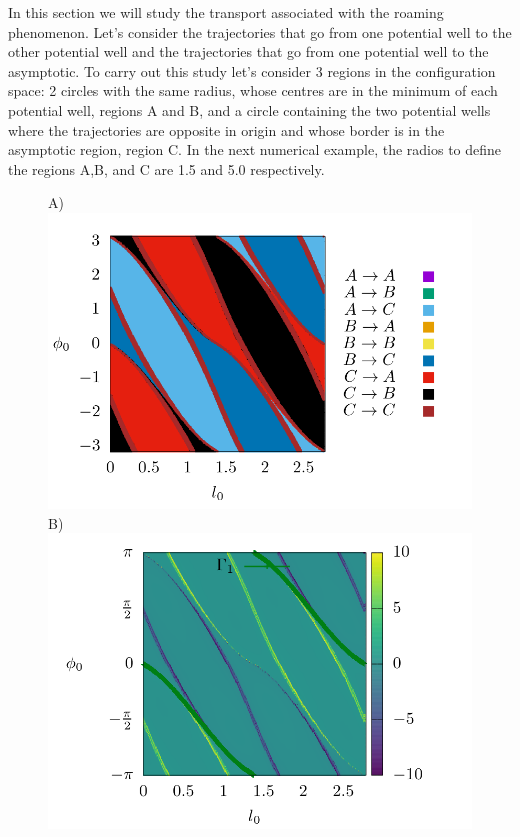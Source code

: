 \documentclass[10pt,aps,onecolumn,superscriptaddress]{revtex4-2}
\begin{document}
In this section we will study the transport associated with the roaming phenomenon. Let's consider the trajectories that go from one potential well to the other potential well and the trajectories that go from one potential well to the asymptotic. To carry out this study let's consider 3 regions in the configuration space: 2 circles with the same radius, whose centres are in the minimum of each potential well, regions A and B, and a circle containing the two potential wells where the trajectories are opposite in origin and whose border is in the asymptotic region, region C. In the next numerical example, the radios to define the regions A,B, and C are 1.5 and 5.0 respectively.


\begin{figure}[htbp]
	A)\includegraphics[scale=0.35]{fate_map_ds_gamma1E_001.png}
	B)\includegraphics[scale=0.35]{ld_action_ds_gamma1_E_001.png}

\end{figure}
\end{document}
